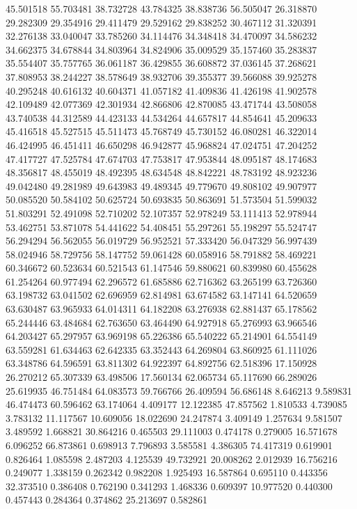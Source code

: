 45.501518
55.703481
38.732728
43.784325
38.838736
56.505047
26.318870
29.282309
29.354916
29.411479
29.529162
29.838252
30.467112
31.320391
32.276138
33.040047
33.785260
34.114476
34.348418
34.470097
34.586232
34.662375
34.678844
34.803964
34.824906
35.009529
35.157460
35.283837
35.554407
35.757765
36.061187
36.429855
36.608872
37.036145
37.268621
37.808953
38.244227
38.578649
38.932706
39.355377
39.566088
39.925278
40.295248
40.616132
40.604371
41.057182
41.409836
41.426198
41.902578
42.109489
42.077369
42.301934
42.866806
42.870085
43.471744
43.508058
43.740538
44.312589
44.423133
44.534264
44.657817
44.854641
45.209633
45.416518
45.527515
45.511473
45.768749
45.730152
46.080281
46.322014
46.424995
46.451411
46.650298
46.942877
45.968824
47.024751
47.204252
47.417727
47.525784
47.674703
47.753817
47.953844
48.095187
48.174683
48.356817
48.455019
48.492395
48.634548
48.842221
48.783192
48.923236
49.042480
49.281989
49.643983
49.489345
49.779670
49.808102
49.907977
50.085520
50.584102
50.625724
50.693835
50.863691
51.573504
51.599032
51.803291
52.491098
52.710202
52.107357
52.978249
53.111413
52.978944
53.462751
53.871078
54.441622
54.408451
55.297261
55.198297
55.524747
56.294294
56.562055
56.019729
56.952521
57.333420
56.047329
56.997439
58.024946
58.729756
58.147752
59.061428
60.058916
58.791882
58.469221
60.346672
60.523634
60.521543
61.147546
59.880621
60.839980
60.455628
61.254264
60.977494
62.296572
61.685886
62.716362
63.265199
63.726360
63.198732
63.041502
62.696959
62.814981
63.674582
63.147141
64.520659
63.630487
63.965933
64.014311
64.182208
63.276938
62.881437
65.178562
65.244446
63.484684
62.763650
63.464490
64.927918
65.276993
63.966546
64.203427
65.297957
63.969198
65.226386
65.540222
65.214901
64.554149
63.559281
61.634463
62.642335
63.352443
64.269804
63.860925
61.111026
63.348786
64.596591
63.811302
64.922397
64.892756
62.518396
17.150928
26.270212
65.307339
63.498506
17.560134
62.065734
65.117690
66.289026
25.619935
46.751484
64.083573
59.766766
26.409594
56.686148
8.646213
9.589831
46.474473
60.596462
63.174064
4.409177
12.122385
47.857562
1.810533
4.739085
3.783132
11.117567
10.609056
18.022690
24.247874
3.409149
1.257634
9.581507
3.489592
1.668821
30.864216
0.465503
29.111003
0.474178
0.279005
16.571678
6.096252
66.873861
0.698913
7.796893
3.585581
4.386305
74.417319
0.619901
0.826464
1.085598
2.487203
4.125539
49.732921
20.008262
2.012939
16.756216
0.249077
1.338159
0.262342
0.982208
1.925493
16.587864
0.695110
0.443356
32.373510
0.386408
0.762190
0.341293
1.468336
0.609397
10.977520
0.440300
0.457443
0.284364
0.374862
25.213697
0.582861
